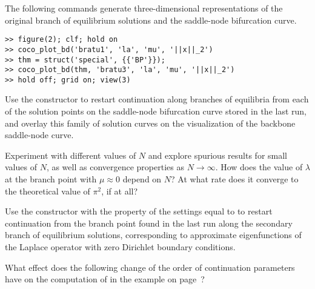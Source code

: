 The following commands generate three-dimensional representations of the original branch of equilibrium solutions and the saddle-node bifurcation curve.
\begin{lstlisting}[language=coco-highlight]
>> figure(2); clf; hold on
>> coco_plot_bd('bratu1', 'la', 'mu', '||x||_2')
>> thm = struct('special', {{'BP'}});
>> coco_plot_bd(thm, 'bratu3', 'la', 'mu', '||x||_2')
>> hold off; grid on; view(3)
\end{lstlisting}
\medskip

\begin{exercises}
\item Use the  constructor to restart continuation along branches of equilibria from each of the solution points on the saddle-node bifurcation curve stored in the last run, and overlay this family of solution curves on the visualization of the backbone saddle-node curve.
\item Experiment with different values of $N$ and explore spurious results for small values of $N$, as well as convergence properties as $N\rightarrow\infty$. How does the value of $\lambda$ at the branch point with $\mu\approx 0$ depend on $N$? At what rate does it converge to the theoretical value of $\pi^2$, if at all?
\item Use the  constructor with the  property of the  settings equal to  to restart continuation from the branch point found in the last run along the secondary branch of equilibrium solutions, corresponding to approximate eigenfunctions of the Laplace operator with zero Dirichlet boundary conditions.

\item What effect does the following change of the order of continuation parameters
have on the computation of  in the example on page~\pageref{bratu.bd1}?


\end{exercises}

